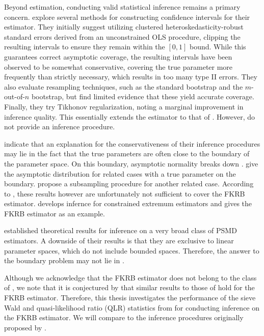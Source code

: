 Beyond estimation, conducting valid statistical inference remains a primary concern. 
\citet{FoxKimRyanBajari2011} explore several methods for constructing confidence intervals for their estimator. 
They initially suggest utilizing clustered heteroskedasticity-robust standard errors derived from an unconstrained OLS procedure, clipping the resulting intervals to ensure they remain within the $[0,1]$ bound. 
While this guarantees correct asymptotic coverage, the resulting intervals have been observed to be somewhat conservative, covering the true parameter more frequently than strictly necessary, which results in too many type II errors. 
They also evaluate resampling techniques, such as the standard bootstrap \citep{Efron1979} and the $m$-out-of-$n$ bootstrap, but find limited evidence that these yield accurate coverage. 
Finally, they try Tikhonov regularization, noting a marginal improvement in inference quality. 
This essentially extends the estimator to that of \citet{HeissHetzeneckerOsterhaus2022}.
However, \citet{HeissHetzeneckerOsterhaus2022} do not provide an inference procedure.

\citet{FoxKimRyanBajari2011} indicate that an explanation for the conservativeness of their inference procedures may lie in the fact that the true parameters are often close to the boundary of the parameter space.
On this boundary, asymptotic normality breaks down \citep{Andrews1999}.
\citet{Andrews1999,Andrews2001,Andrews2002} give the asymptotic distribution for related cases with a true parameter on the boundary.
\citet{AndrewsGuggenberger2010Applications} propose a subsampling procedure for another related case.
According to \citet{FoxKimRyanBajari2011}, these results however are unfortunately not sufficient to cover the FKRB estimator.
\citet{Li2025The,Li2025Inference} develops infernce for constrained extremum estimators and gives the FKRB estimator as an example.

\citet{ChenPouzo2015} established theoretical results for inference on a very broad class of PSMD estimators.
A downside of their results is that they are exclusive to linear parameter spaces, which do not include bounded spaces.
Therefore, the answer to the boundary problem may not lie in \citet{ChenPouzo2015}.

Although we acknowledge that the FKRB estimator does not belong to the class of \citet{ChenPouzo2015}, we note that it is conjectured by \citet{FoxKimYang2016} that similar results to those of \citet{ChenLintonVanKeilegom2003} hold for the FKRB estimator.
Therefore, this thesis investigates the performance of the sieve Wald and quasi-likelihood ratio (QLR) statistics from \citet{ChenPouzo2015} for conducting inference on the FKRB estimator.
We will compare to the inference procedures originally proposed by \citet{FoxKimRyanBajari2011}.

